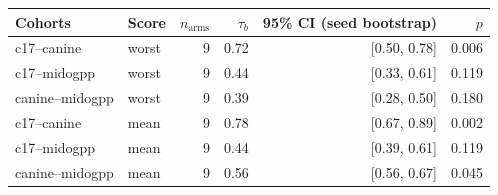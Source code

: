 \begin{tabular}{llrrrr}
\toprule
Cohorts & Score & $n_\text{arms}$ & $\tau_b$ & 95\% CI (seed bootstrap) & $p$ \\
\midrule
c17--canine & worst & 9 & 0.72 & [0.50, 0.78] & 0.006 \\
c17--midogpp & worst & 9 & 0.44 & [0.33, 0.61] & 0.119 \\
canine--midogpp & worst & 9 & 0.39 & [0.28, 0.50] & 0.180 \\
c17--canine & mean & 9 & 0.78 & [0.67, 0.89] & 0.002 \\
c17--midogpp & mean & 9 & 0.44 & [0.39, 0.61] & 0.119 \\
canine--midogpp & mean & 9 & 0.56 & [0.56, 0.67] & 0.045 \\
\bottomrule
\end{tabular}
